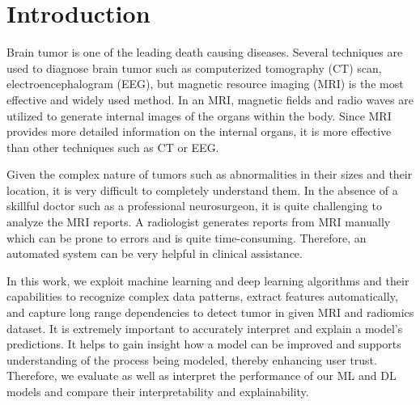 \section{Introduction}
\label{sec:introduction}
Brain tumor is one of the leading death causing diseases. Several techniques are used to diagnose brain tumor such as computerized tomography (CT) scan, electroencephalogram (EEG), but magnetic resource imaging (MRI) is the most effective and widely used method. In an MRI, magnetic fields and radio waves are utilized to generate internal images of the organs within the body. Since MRI provides more detailed information on the internal organs, it is more effective than other techniques such as CT or EEG.

Given the complex nature of tumors such as abnormalities in their sizes and their location, it is very difficult to completely understand them. In the absence of a skillful doctor such as a professional neurosurgeon, it is quite challenging to analyze the MRI reports. A radiologist generates reports from MRI manually which can be prone to errors and is quite time-consuming. Therefore, an automated system can be very helpful in clinical assistance.

In this work, we exploit machine learning and deep learning algorithms and their capabilities to recognize complex data patterns, extract features automatically, and capture long range dependencies to detect tumor in given MRI and radiomics dataset. It is extremely important to accurately interpret and explain a model’s predictions. It helps to gain insight how a model can be improved and supports understanding of the process being modeled, thereby enhancing user trust. Therefore, we evaluate as well as interpret the performance of our ML and DL models and compare their interpretability and explainability.

